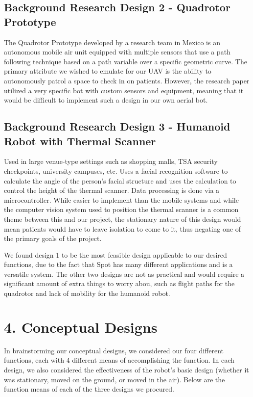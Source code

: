 ﻿\documentclass[10pt]{article}
\begin{document}
\subsection{Background Research Design 2 - Quadrotor Prototype}
The Quadrotor Prototype developed by a research team in Mexico is an autonomous mobile air unit equipped with multiple sensors that use a path following technique based on a path variable over a specific geometric curve. The primary attribute we wished to emulate for our UAV is the ability to autonomously patrol a space to check in on patients. However, the research paper utilized a very specific bot with custom sensors and equipment, meaning that it would be difficult to implement such a design in our own aerial bot. 

\subsection{Background Research Design 3 - Humanoid Robot with Thermal Scanner}
Used in large venue-type settings such as shopping malls, TSA security checkpoints, university campuses, etc. Uses a facial recognition software to calculate the angle of the person’s facial structure and uses the calculation to control the height of the thermal scanner.  Data processing is done via a microcontroller. While easier to implement than the mobile systems and while the computer vision system used to position the thermal scanner is a common theme between this and our project, the stationary nature of this design would mean patients would have to leave isolation to come to it, thus negating one of the primary goals of the project.

We found design 1 to be the most feasible design applicable to our desired functions, due to the fact that Spot has many different applications and is a versatile system. The other two designs are not as practical and would require a significant amount of extra things to worry abou, such as flight paths for the quadrotor and lack of mobility for the humanoid robot. 

\section{4. Conceptual Designs}
In brainstorming our conceptual designs, we considered our four different functions, each with 4 different means of accomplishing the function. In each design, we also considered the effectiveness of the robot’s basic design (whether it was stationary, moved on the ground, or moved in the air). Below are the function means of each of the three designs we procured.
\end{document}
